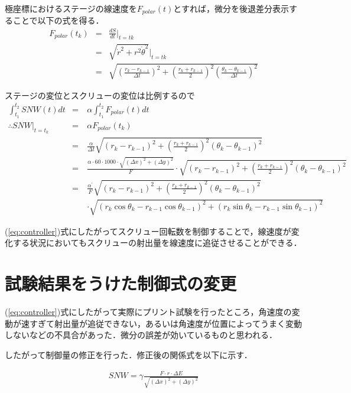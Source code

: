 \documentclass[twocolumn,oneside,a4paper]{article}
\begin{document}
極座標におけるステージの線速度を$F_{polar}(t)$とすれば，微分を後退差分表示することで以下の式を得る．
\begin{eqnarray*}
F_{polar}(t_k) &=& \frac{d S}{d t}\Bigg|_{t=tk} \\
&=& \sqrt{\dot{r}^2+r^2 \dot{\theta}^2}\Big|_{t=tk} \\
&=& \sqrt{\left( \frac{r_k - r_{k-1}}{\Delta t} \right)^2 + \left(\frac{r_k+r_{k-1}}{2} \right)^2 \left( \frac{\theta_k - \theta_{k-1} }{\Delta t} \right)^2}	
\end{eqnarray*}

ステージの変位とスクリューの変位は比例するので
\begin{eqnarray}\label{eq:controller}
\int_{t_1}^{t_2} SNW(t)dt &=& \alpha \int_{t_1}^{t_2} F_{polar}(t) dt \nonumber \\
\therefore SNW\big|_{t=t_k} &=& \alpha F_{polar}(t_k)  \nonumber \\
&=& \frac{\alpha}{\Delta t} \sqrt{\left( r_k - r_{k-1} \right)^2 + \left(\frac{r_k+r_{k-1}}{2} \right)^2 \left( \theta_k - \theta_{k-1} \right)^2} \nonumber \\
&=& \frac{\alpha \cdot 60\cdot1000 \cdot \sqrt{(\Delta x)^2+(\Delta y)^2}}{F} \cdot \sqrt{\left( r_k - r_{k-1} \right)^2 + \left(\frac{r_k+r_{k-1}}{2} \right)^2  \left( \theta_k - \theta_{k-1} \right)^2} \nonumber \\
&=& \frac{\alpha^\prime}{F} \sqrt{\left( r_k - r_{k-1} \right)^2 + \left(\frac{r_k+r_{k-1}}{2} \right)^2  \left( \theta_k - \theta_{k-1} \right)^2 }  \nonumber \\
&\quad& \cdot \sqrt{ (r_k \cos\theta_k - r_{k-1} \cos\theta_{k-1})^2+(r_k \sin\theta_k - r_{k-1} \sin\theta_{k-1})^2 }
\end{eqnarray}

(\ref{eq:controller})式にしたがってスクリュー回転数を制御することで，線速度が変化する状況においてもスクリューの射出量を線速度に追従させることができる．
\clearpage

\section{試験結果をうけた制御式の変更}
(\ref{eq:controller})式にしたがって実際にプリント試験を行ったところ，角速度の変動が速すぎて射出量が追従できない，あるいは角速度が位置によってうまく変動しないなどの不具合があった．微分の誤差が効いているものと思われる．

したがって制御量の修正を行った．修正後の関係式を以下に示す．

\begin{eqnarray}\label{eq:fix}
  SNW = \gamma \frac{F\cdot r\cdot  \Delta E}{\sqrt{(\Delta x)^2+(\Delta y)^2}} 
\end{eqnarray}
\end{document}
